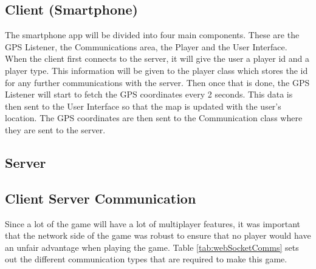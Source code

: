 \documentclass{l4proj}
\begin{document}
\subsection{Client (Smartphone)}
\label{designClient}
The smartphone app will be divided into four main components. These are the GPS Listener, the Communications area, the
Player and the User Interface. When the client first connects to the server, it will give the user a player id and a player
type. This information will be given to the player class which stores the id for any further communications with the server.
Then once that is done, the GPS Listener will start to fetch the GPS coordinates every 2 seconds. This data is then sent
to the User Interface so that the map is updated with the user's location. The GPS coordinates are then sent to the Communication
class where they are sent to the server.

\subsection{Server}


\subsection{Client Server Communication}
\label{communication}
Since a lot of the game will have a lot of multiplayer features, it was important that the network side of the game
was robust to ensure that no player would have an unfair advantage when playing the game. Table \ref{tab:webSocketComms}
sets out the different communication types that are required to make this game.

\begin{table}[]
    \caption{The different communication types to the server  }\label{tab:webSocketComms}
    
    \end{table}
\end{document}
